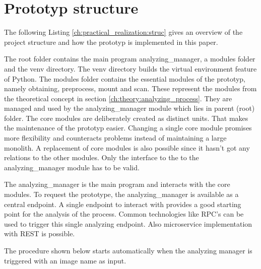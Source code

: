 \section{Prototyp structure}
\label{ch:practical_realization:prot_struct}
The following Listing \ref{ch:practical_realization:struc} gives an overview of the project structure and how the prototyp is implemented in this paper.

The root folder contains the main program analyzing\_manager, a modules folder and the venv directory.
The venv directory builds the virtual environment feature of Python. 
The modules folder contains the essential modules of the prototyp, namely obtaining, preprocess, mount and scan. These represent the modules from the theoretical concept in section \ref{ch:theory:analyzing_process}. 
They are managed and used by the analyzing\_manager module which lies in parent (root) folder. 
The core modules are deliberately created as distinct units. That makes the maintenance of the prototyp easier. Changing a single core module promises more flexibility and counteracts problems instead of maintaining a large monolith. A replacement of core modules is also possible since it hasn't got any relations to the other modules. Only the interface to the to the analyzing\_manager module has to be valid.

The analyzing\_manager is the main program and interacts with the core modules. 
To request the prototype, the analyzing\_manager is available as a central endpoint. A single endpoint to interact with provides a good starting point for the analysis of the process. Common technologies like RPC's can be used to trigger this single analyzing endpoint. Also microservice implementation with REST is possible.

The procedure shown below starts automatically when the analyzing manager is triggered with an image name as input.

